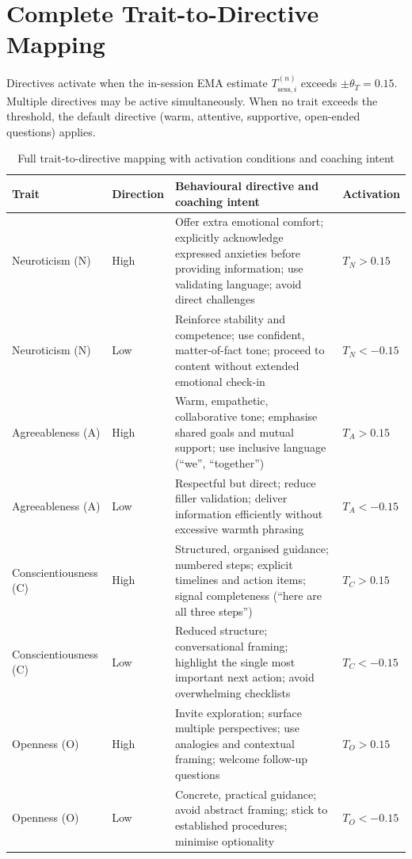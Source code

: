 \documentclass[10pt,a4paper]{report}
\begin{document}
\chapter{Complete Trait-to-Directive Mapping}
\label{app:directives}

Directives activate when the in-session EMA estimate $T_{\text{sess},i}^{(n)}$ exceeds $\pm\theta_T = 0.15$. Multiple directives may be active simultaneously. When no trait exceeds the threshold, the default directive (warm, attentive, supportive, open-ended questions) applies.

\begin{table}[H]
\centering\small
\caption{Full trait-to-directive mapping with activation conditions and coaching intent}
\begin{tabularx}{\textwidth}{@{}llXl@{}}
\toprule
Trait & Direction & Behavioural directive and coaching intent & Activation \\
\midrule
Neuroticism (N) & High & Offer extra emotional comfort; explicitly acknowledge expressed anxieties before providing information; use validating language; avoid direct challenges & $T_N > 0.15$ \\
Neuroticism (N) & Low & Reinforce stability and competence; use confident, matter-of-fact tone; proceed to content without extended emotional check-in & $T_N < -0.15$ \\
Agreeableness (A) & High & Warm, empathetic, collaborative tone; emphasise shared goals and mutual support; use inclusive language (``we'', ``together'') & $T_A > 0.15$ \\
Agreeableness (A) & Low & Respectful but direct; reduce filler validation; deliver information efficiently without excessive warmth phrasing & $T_A < -0.15$ \\
Conscientiousness (C) & High & Structured, organised guidance; numbered steps; explicit timelines and action items; signal completeness (``here are all three steps'') & $T_C > 0.15$ \\
Conscientiousness (C) & Low & Reduced structure; conversational framing; highlight the single most important next action; avoid overwhelming checklists & $T_C < -0.15$ \\
Openness (O) & High & Invite exploration; surface multiple perspectives; use analogies and contextual framing; welcome follow-up questions & $T_O > 0.15$ \\
Openness (O) & Low & Concrete, practical guidance; avoid abstract framing; stick to established procedures; minimise optionality & $T_O < -0.15$ \\

\end{tabularx}
\end{table}
\end{document}
